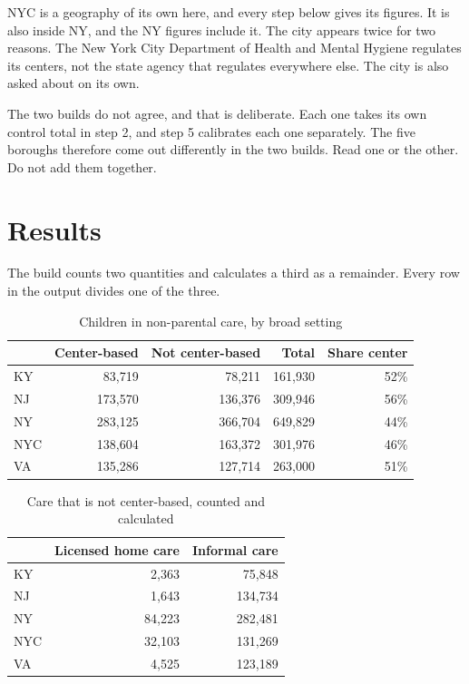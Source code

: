 \documentclass[11pt]{article}
\begin{document}
NYC is a geography of its own here, and every step below gives its figures. It
is also inside NY, and the NY figures include it. The city appears twice for two reasons.
The New York City Department of Health and Mental Hygiene regulates its centers,
not the state agency that regulates everywhere else. The city is also asked
about on its own.

The two builds do not agree, and that is deliberate. Each one takes its own
control total in step 2, and step 5 calibrates each one separately. The five
boroughs therefore come out differently in the two builds. Read one
or the other. Do not add them together.

\section{Results}

The build counts two quantities and calculates a third as a remainder. Every
row in the output divides one of the three.

\begin{table}[H]
\centering
\caption{Children in non-parental care, by broad setting}
\begin{tabular}{L{1.6cm}rrrr}
\toprule
& \textbf{Center-based} & \textbf{Not center-based} & \textbf{Total} & \textbf{Share center} \\
\midrule
KY  &  83,719 &  78,211 & 161,930 & 52\% \\
NJ  & 173,570 & 136,376 & 309,946 & 56\% \\
NY  & 283,125 & 366,704 & 649,829 & 44\% \\
NYC & 138,604 & 163,372 & 301,976 & 46\% \\
VA  & 135,286 & 127,714 & 263,000 & 51\% \\
\bottomrule
\end{tabular}
\end{table}

\begin{table}[H]
\centering
\caption{Care that is not center-based, counted and calculated}
\begin{tabular}{L{1.6cm}rr}
\toprule
& \textbf{Licensed home care} & \textbf{Informal care} \\
\midrule
KY  &  2,363 &  75,848 \\
NJ  &  1,643 & 134,734 \\
NY  & 84,223 & 282,481 \\
NYC & 32,103 & 131,269 \\
VA  &  4,525 & 123,189 \\
\bottomrule
\end{tabular}
\end{table}
\end{document}
